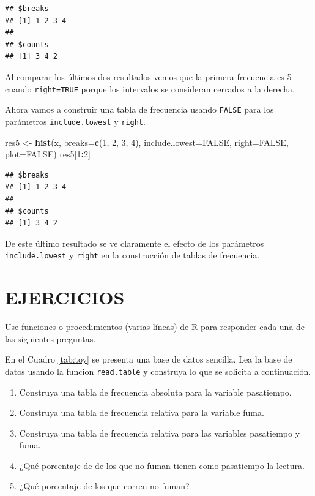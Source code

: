 \documentclass[10pt,]{krantz}
\makeatletter
\newenvironment{Shaded}{\begin{snugshade}}{\end{snugshade}}
\newcommand{\KeywordTok}[1]{\textcolor[rgb]{0.13,0.29,0.53}{\textbf{#1}}}
\newcommand{\DataTypeTok}[1]{\textcolor[rgb]{0.13,0.29,0.53}{#1}}
\newcommand{\DecValTok}[1]{\textcolor[rgb]{0.00,0.00,0.81}{#1}}
\newcommand{\StringTok}[1]{\textcolor[rgb]{0.31,0.60,0.02}{#1}}
\newcommand{\OtherTok}[1]{\textcolor[rgb]{0.56,0.35,0.01}{#1}}
\newcommand{\OperatorTok}[1]{\textcolor[rgb]{0.81,0.36,0.00}{\textbf{#1}}}
\newcommand{\NormalTok}[1]{#1}
\providecommand{\tightlist}{%
  \setlength{\itemsep}{0pt}\setlength{\parskip}{0pt}}
\newenvironment{kframe}{%
\medskip{}
\setlength{\fboxsep}{.8em}
 \def\at@end@of@kframe{}%
 \ifinner\ifhmode%
  \def\at@end@of@kframe{\end{minipage}}%
  \begin{minipage}{\columnwidth}%
 \fi\fi%
 \def\FrameCommand##1{\hskip\@totalleftmargin \hskip-\fboxsep
 \colorbox{shadecolor}{##1}\hskip-\fboxsep
     \hskip-\linewidth \hskip-\@totalleftmargin \hskip\columnwidth}%
 \MakeFramed {\advance\hsize-\width
   \@totalleftmargin\z@ \linewidth\hsize
   \@setminipage}}%
 {\par\unskip\endMakeFramed%
 \at@end@of@kframe}
\renewenvironment{Shaded}{\begin{kframe}}{\end{kframe}}
\makeatother
\begin{document}
\begin{verbatim}
## $breaks
## [1] 1 2 3 4
## 
## $counts
## [1] 3 4 2
\end{verbatim}

Al comparar los últimos dos resultados vemos que la primera frecuencia
es 5 cuando \texttt{right=TRUE} porque los intervalos se consideran
cerrados a la derecha.

Ahora vamos a construir una tabla de frecuencia usando \texttt{FALSE}
para los parámetros \texttt{include.lowest} y \texttt{right}.

\begin{Shaded}
\begin{Highlighting}[]
\NormalTok{res5 <-}\StringTok{ }\KeywordTok{hist}\NormalTok{(x, }\DataTypeTok{breaks=}\KeywordTok{c}\NormalTok{(}\DecValTok{1}\NormalTok{, }\DecValTok{2}\NormalTok{, }\DecValTok{3}\NormalTok{, }\DecValTok{4}\NormalTok{),}
             \DataTypeTok{include.lowest=}\OtherTok{FALSE}\NormalTok{, }\DataTypeTok{right=}\OtherTok{FALSE}\NormalTok{,}
             \DataTypeTok{plot=}\OtherTok{FALSE}\NormalTok{)}
\NormalTok{res5[}\DecValTok{1}\OperatorTok{:}\DecValTok{2}\NormalTok{]}
\end{Highlighting}
\end{Shaded}

\begin{verbatim}
## $breaks
## [1] 1 2 3 4
## 
## $counts
## [1] 3 4 2
\end{verbatim}

De este último resultado se ve claramente el efecto de los parámetros
\texttt{include.lowest} y \texttt{right} en la construcción de tablas de
frecuencia.

\section*{EJERCICIOS}\label{ejercicios-4}


Use funciones o procedimientos (varias líneas) de R para responder cada
una de las siguientes preguntas.

En el Cuadro \ref{tab:toy} se presenta una base de datos sencilla. Lea
la base de datos usando la funcion \texttt{read.table} y construya lo
que se solicita a continuación.

\begin{enumerate}
\def\labelenumi{\arabic{enumi}.}
\tightlist
\item
  Construya una tabla de frecuencia absoluta para la variable
  pasatiempo.
\item
  Construya una tabla de frecuencia relativa para la variable fuma.
\item
  Construya una tabla de frecuencia relativa para las variables
  pasatiempo y fuma.
\item
  ¿Qué porcentaje de de los que no fuman tienen como pasatiempo la
  lectura.
\item
  ¿Qué porcentaje de los que corren no fuman?
\end{enumerate}
\end{document}
